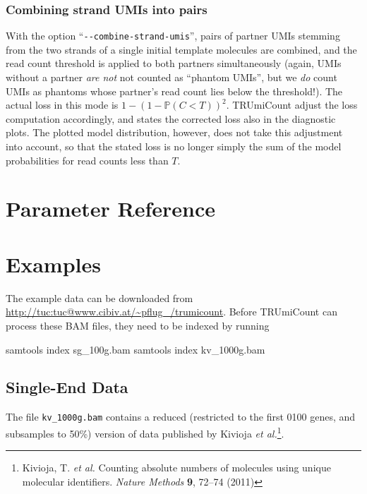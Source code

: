 \documentclass[10pt]{article}
\newcommand{\ddarg}[1]{\texttt{-{}-#1}}
\begin{document}
\subsubsection*{Combining strand UMIs into pairs}

With the option ``\ddarg{combine-strand-umis}'', pairs of partner UMIs stemming from the two strands of a single initial template molecules are combined, and the read count threshold is applied to both partners simultaneously (again, UMIs without a partner \emph{are not} not counted as ``phantom UMIs'', but we \emph{do} count UMIs as phantoms whose partner's read count lies below the threshold!). The actual loss in this mode is $1 - (1-\mathbb{P}(C < T))^2$. TRUmiCount adjust the loss computation accordingly, and states the corrected loss also in the diagnostic plots. The plotted model distribution, however, does not take this adjustment into account, so that the stated loss is no longer simply the sum of the model probabilities for read counts less than $T$.

\pagebreak
\section{Parameter Reference}\label{parameter-reference}

\begin{description}

\end{description}

\pagebreak
\section{Examples}\label{examples}

The example data can be downloaded from \url{http://tuc:tuc@www.cibiv.at/~pflug_/trumicount}. Before TRUmiCount can process these BAM files, they need to be indexed by running

\begin{shellcode}
samtools index sg_100g.bam
samtools index kv_1000g.bam
\end{shellcode}

\subsection{Single-End Data}

The file \texttt{kv\_1000g.bam} contains a reduced (restricted to the first 0100 genes, and subsamples to 50\%) version of data published by Kivioja \textit{et al.}\footnote{Kivioja, T. \textit{et al.} Counting absolute numbers of molecules using unique molecular identifiers. \textit{Nature Methods} \textbf{9}, 72–74 (2011)}.
\end{document}
